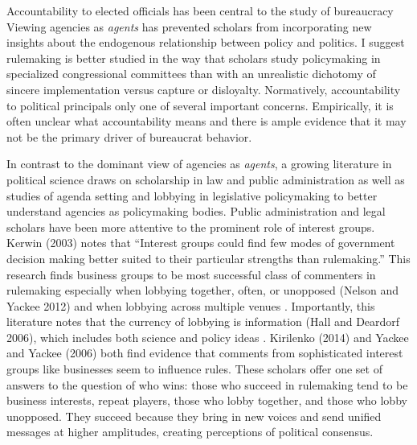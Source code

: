 Accountability to elected officials has been central to the study of bureaucracy \citep{Epstein1999,Huber2002,McCubbins1984,Wilson1989,Potter2016Slow-RollingRulemaking,Lowande2018PoliticizationAgencies} %
Viewing agencies as \textit{agents} has prevented scholars from incorporating new insights about the endogenous relationship between policy and politics. I suggest rulemaking is better studied in the way that scholars study policymaking in specialized congressional committees than with an unrealistic dichotomy of sincere implementation versus capture or disloyalty. Normatively, accountability to political principals only one of several important concerns. Empirically, it is often unclear what accountability means and there is ample evidence that it may not be the primary driver of bureaucrat behavior.

In contrast to the dominant view of agencies as \textit{agents}, a growing literature in political science draws on scholarship in law and public administration as well as studies of agenda setting and lobbying in legislative policymaking to better understand agencies as policymaking bodies. Public administration and legal scholars have been more attentive to the prominent role of interest groups.  Kerwin (2003) notes that ``Interest groups could find few modes of government decision making better suited to their particular strengths than rulemaking.'' This research finds business groups to be most successful class of commenters in rulemaking \citep{Yackee2006a} especially when lobbying together, often, or unopposed (Nelson and Yackee 2012) and when lobbying across multiple venues \citep{Yackee2015}. Importantly, this literature notes that the currency of lobbying is information (Hall and Deardorf 2006), which includes both science and policy ideas \citep{Jones2005}. Kirilenko (2014) and Yackee and Yackee (2006) both find evidence that comments from sophisticated interest groups like businesses seem to influence rules. These scholars offer one set of answers to the question of who wins: those who succeed in rulemaking tend to be business interests, repeat players, those who lobby together, and those who lobby unopposed. They succeed because they bring in new voices and send unified messages at higher amplitudes, creating perceptions of political consensus.



